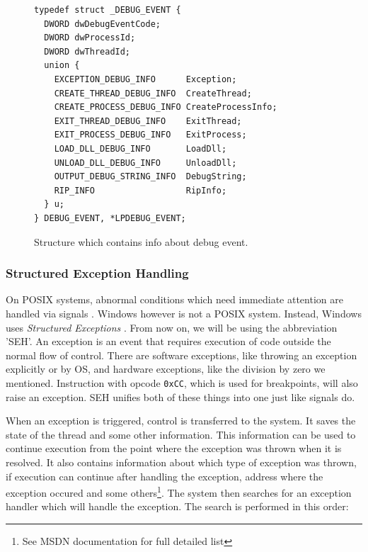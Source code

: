 \begin{figure}
\begin{verbatim}
typedef struct _DEBUG_EVENT {
  DWORD dwDebugEventCode;
  DWORD dwProcessId;
  DWORD dwThreadId;
  union {
    EXCEPTION_DEBUG_INFO      Exception;
    CREATE_THREAD_DEBUG_INFO  CreateThread;
    CREATE_PROCESS_DEBUG_INFO CreateProcessInfo;
    EXIT_THREAD_DEBUG_INFO    ExitThread;
    EXIT_PROCESS_DEBUG_INFO   ExitProcess;
    LOAD_DLL_DEBUG_INFO       LoadDll;
    UNLOAD_DLL_DEBUG_INFO     UnloadDll;
    OUTPUT_DEBUG_STRING_INFO  DebugString;
    RIP_INFO                  RipInfo;
  } u;
} DEBUG_EVENT, *LPDEBUG_EVENT;
\end{verbatim}
\caption{Structure which contains info about debug event.}
\label{fig:DebugEvent}
\end{figure}

\subsubsection*{Structured Exception Handling}
On POSIX systems, abnormal conditions which need immediate attention are
handled via signals . Windows however is not a POSIX system.
Instead, Windows uses \textit{Structured Exceptions} \cite{windows-msdn-seh}.
From now on, we will be using the abbreviation 'SEH'. An exception is an event
that requires execution of code outside the normal flow of control. There are
software exceptions, like throwing an exception explicitly or by OS, and
hardware exceptions, like the division by zero we mentioned. Instruction with
opcode \texttt{0xCC}, which is used for breakpoints, will also raise an
exception. SEH unifies both of these things into one just like signals do.

When an exception is triggered, control is transferred to the system. It saves
the state of the thread and some other information. This information can be
used to continue execution from the point where the exception was thrown when
it is resolved. It also contains information about which type of exception was
thrown, if execution can continue after handling the exception, address where
the exception occured and some others\footnote{See MSDN documentation
\cite{windows-msdn-seh} for full detailed list}. The system then searches for
an exception handler which will handle the exception. The search is performed
in this order:

